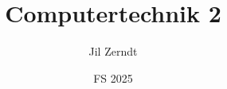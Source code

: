 \documentclass[a4paper, fontsize = 8pt, landscape]{scrartcl}
\title{Computertechnik 2}
\author{Jil Zerndt}
\date{FS 2025}
\begin{document}
\begin{multicols}{2}
	\thispagestyle{TitlePageStyle}
	\maketitle
	\sffamily
	
	\raggedcolumns
	\pagebreak
	
	\raggedcolumns
	\pagebreak
	
	\raggedcolumns
	\pagebreak
	
	\raggedcolumns
	\pagebreak
	
	\raggedcolumns
	\pagebreak
	
	\raggedcolumns
	\pagebreak
	
	\raggedcolumns
	\pagebreak
	
	\raggedcolumns
	\pagebreak
	
	\raggedcolumns
	\pagebreak
	
	\raggedcolumns
	\pagebreak
	
	\raggedcolumns
\end{multicols}
\end{document}

